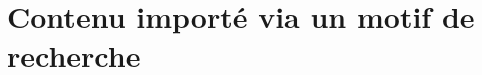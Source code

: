 \documentclass[varwidth, border = 3pt]{standalone}
\begin{document}
\section{Contenu importé via un motif de recherche}

%
%
%
%
\end{document}
